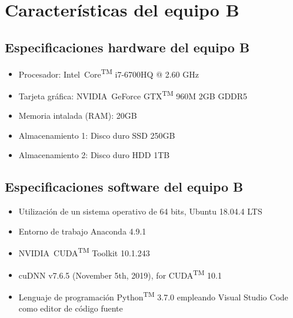\section{Características del equipo B}
\label{sec:caracteristicas-segun-equipob}

\subsection{Especificaciones hardware del equipo B}
\label{subsec:especificaciones-hardware-equipob}

\begin{itemize}
  \item Procesador: Intel\textregistered\ Core\textsuperscript{TM} i7-6700HQ @ 2.60 GHz
  \item Tarjeta gráfica: NVIDIA\textregistered\ GeForce GTX\textsuperscript{TM} 960M 2GB GDDR5
  \item Memoria intalada (RAM): 20GB
  \item Almacenamiento 1: Disco duro SSD 250GB
  \item Almacenamiento 2: Disco duro HDD 1TB
\end{itemize}

\subsection{Especificaciones software del equipo B}
\label{subsec:especificaciones-software-equipob}
\begin{itemize}
  \item Utilización de un sistema operativo de 64 bits, Ubuntu 18.04.4 LTS
  \item Entorno de trabajo Anaconda 4.9.1
  \item NVIDIA\textregistered\ CUDA\textsuperscript{TM} Toolkit 10.1.243 
  \item cuDNN v7.6.5 (November 5th, 2019), for CUDA\textsuperscript{TM} 10.1
  \item Lenguaje de programación Python\textsuperscript{TM} 3.7.0 empleando Visual Studio Code como editor de código fuente
\end{itemize}